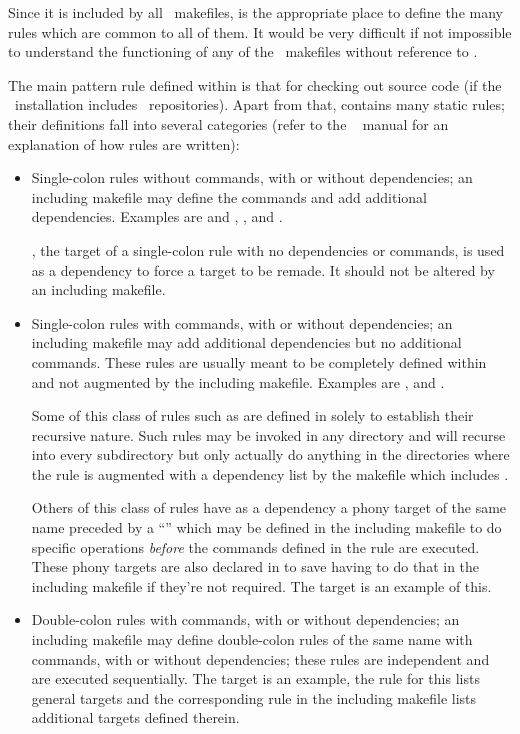 Since it is included by all \aipspp\ makefiles,  is the
appropriate place to define the many rules which are common to all of them.
It would be very difficult if not impossible to understand the functioning of
any of the \aipspp\ makefiles without reference to .

The main pattern rule defined within  is that for checking out
source code (if the \aipspp\ installation includes \rcs\ repositories).
Apart from that,  contains many static rules; their definitions
fall into several categories (refer to the \gnu\  manual for an
explanation of how rules are written):

\begin{itemize}
\item
   Single-colon rules without commands, with or without dependencies; an
   including makefile may define the commands and add additional dependencies.
   Examples are  and , , 
   and .

   , the target of a single-colon rule with no dependencies or
   commands, is used as a dependency to force a target to be remade.  It
   should not be altered by an including makefile.

\item
   Single-colon rules with commands, with or without dependencies; an
   including makefile may add additional dependencies but no additional
   commands.  These rules are usually meant to be completely defined within
    and not augmented by the including makefile.  Examples are
   ,  and .

   Some of this class of rules such as  are defined in
    solely to establish their recursive nature.  Such rules may
   be invoked in any directory and will recurse into every subdirectory but
   only actually do anything in the directories where the rule is augmented
   with a dependency list by the makefile which includes .

   Others of this class of rules have as a dependency a phony target of the
   same name preceded by a ``'' which may be defined in the including
   makefile to do specific operations {\em before} the commands defined in
   the  rule are executed.  These phony targets are also
   declared in  to save having to do that in the including
   makefile if they're not required.  The  target is an example of
   this.

\item
   Double-colon rules with commands, with or without dependencies; an
   including makefile may define double-colon rules of the same name with
   commands, with or without dependencies; these rules are independent and are
   executed sequentially.  The  target is an example, the
    rule for this lists general targets and the corresponding
   rule in the including makefile lists additional targets defined therein.
\end{itemize}

